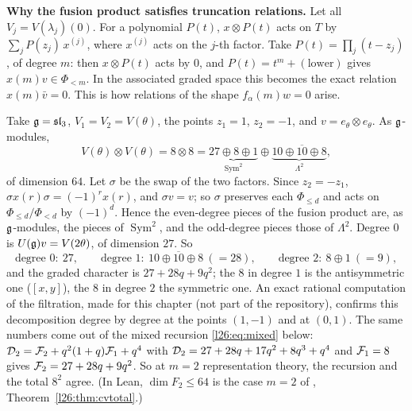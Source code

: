 \textbf{Why the fusion product satisfies truncation relations.} Let all $V_j=V(\lambda_j)(0)$. For a polynomial $P(t)$,
$x\otimes P(t)$ acts on $T$ by $\sum_jP(z_j)\,x^{(j)}$, where $x^{(j)}$ acts on the $j$-th factor. Take $P(t)=\prod_j(t-z_j)$,
of degree $m$: then $x\otimes P(t)$ acts by $0$, and $P(t)=t^m+(\text{lower})$ gives $x(m)v\in\Phi_{<m}$. In the associated
graded space this becomes the exact relation $x(m)\bar v=0$. This is how relations of the shape $f_\alpha(m)w=0$ arise.

\begin{example}\label{l26:ex:fus88}
Take $\mathfrak g=\mathfrak{sl}_3$, $V_1=V_2=V(\theta)$, the points $z_1=1$, $z_2=-1$, and $v=e_\theta\otimes e_\theta$. As
$\mathfrak g$-modules,
\begin{equation*}
V(\theta)\otimes V(\theta)=8\otimes8=\underbrace{27\oplus8\oplus1}_{\operatorname{Sym}^2}\oplus\underbrace{10\oplus\overline{10}\oplus8}_{\Lambda^2},
\end{equation*}
of dimension $64$. Let $\sigma$ be the swap of the two factors. Since $z_2=-z_1$, $\sigma x(r)\sigma=(-1)^rx(r)$, and
$\sigma v=v$; so $\sigma$ preserves each $\Phi_{\le d}$ and acts on $\Phi_{\le d}/\Phi_{<d}$ by $(-1)^d$. Hence the even-degree
pieces of the fusion product are, as $\mathfrak g$-modules, the pieces of $\operatorname{Sym}^2$, and the odd-degree pieces those
of $\Lambda^2$. Degree $0$ is $U(\mathfrak g)v=V(2\theta)$, of dimension $27$. So
\begin{equation*}
\text{degree }0:\ 27,\qquad \text{degree }1:\ 10\oplus\overline{10}\oplus8\ (=28),\qquad \text{degree }2:\ 8\oplus1\ (=9),
\end{equation*}
and the graded character is $27+28q+9q^2$; the $8$ in degree $1$ is the antisymmetric one ($[x,y]$), the $8$ in degree $2$ the
symmetric one. An exact rational computation of the filtration, made for this chapter (not part of the repository), confirms
this decomposition degree by degree at the points $(1,-1)$ and at $(0,1)$. The same numbers come out of the mixed recursion
\eqref{l26:eq:mixed} below: $\mathcal D_2=\mathcal F_2+q^2(1+q)\mathcal F_1+q^4$ with $\mathcal D_2=27+28q+17q^2+8q^3+q^4$ and
$\mathcal F_1=8$ gives $\mathcal F_2=27+28q+9q^2$. So at $m=2$ representation theory, the recursion and the total $8^2$ agree.
(In Lean, $\dim F_2\le64$ is the case $m=2$ of , Theorem~\ref{l26:thm:cvtotal}.)
\end{example}

